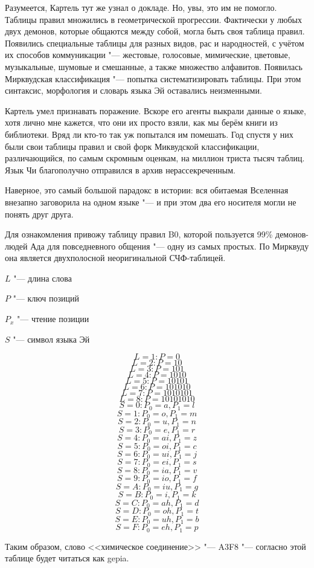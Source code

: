 \documentclass[a4paper,10pt,fleqn]{book}
\begin{document}
Разумеется, Картель тут же узнал о докладе.
Но, увы, это им не помогло.
Таблицы правил множились в геометрической прогрессии.
Фактически у любых двух демонов, которые общаются между собой, могла быть своя таблица правил.
Появились специальные таблицы для разных видов, рас и народностей, с учётом их способов коммуникации "--- жестовые, голосовые, мимические, цветовые, музыкальные, шумовые и смешанные, а также множество алфавитов.
Появилась Мирквудская классификация "--- попытка систематизировать таблицы.
При этом синтаксис, морфология и словарь языка Эй оставались неизменными.

Картель умел признавать поражение.
Вскоре его агенты выкрали данные о языке, хотя лично мне кажется, что они их просто взяли, как мы берём книги из библиотеки.
Вряд ли кто-то так уж попытался им помешать.
Год спустя у них были свои таблицы правил и свой форк Миквудской классификации, различающийся, по самым скромным оценкам, на миллион триста тысяч таблиц.
Язык Чи благополучно отправился в архив нерассекреченным.

Наверное, это самый большой парадокс в истории: вся обитаемая Вселенная внезапно заговорила на одном языке "--- и при этом два его носителя могли не понять друг друга.

Для ознакомления привожу таблицу правил B0, которой пользуется 99\% демонов-людей Ада для повседневного общения "--- одну из самых простых.
По Мирквуду она является двухполосной неоригинальной СЧФ-таблицей.

$L$ "--- длина слова

$P$ "--- ключ позиций

$P_x$ "--- чтение позиции

$S$ "--- символ языка Эй

\[L = 1: P = 0\]
\[L = 2: P = 10\]
\[L = 3: P = 101\]
\[L = 4: P = 1010\]
\[L = 5: P = 10101\]
\[L = 6: P = 101010\]
\[L = 7: P = 1010101\]
\[L = 8: P = 10101010\]
\[S = 0: P_0 = a, P_1 = l\]
\[S = 1: P_0 = o, P_1 = m\]
\[S = 2: P_0 = u, P_1 = n\]
\[S = 3: P_0 = e, P_1 = r\]
\[S = 4: P_0 = ai, P_1 = z\]
\[S = 5: P_0 = oi, P_1 = c\]
\[S = 6: P_0 = ui, P_1 = j\]
\[S = 7: P_0 = ei, P_1 = s\]
\[S = 8: P_0 = ia, P_1 = v\]
\[S = 9: P_0 = io, P_1 = f\]
\[S = A: P_0 = iu, P_1 = g\]
\[S = B: P_0 = i, P_1 = k\]
\[S = C: P_0 = ah, P_1 = d\]
\[S = D: P_0 = oh, P_1 = t\]
\[S = E: P_0 = uh, P_1 = b\]
\[S = F: P_0 = eh, P_1 = p\]

Таким образом, слово <<химическое соединение>> "--- A3F8 "--- согласно этой таблице будет читаться как gepia.
\end{document}
